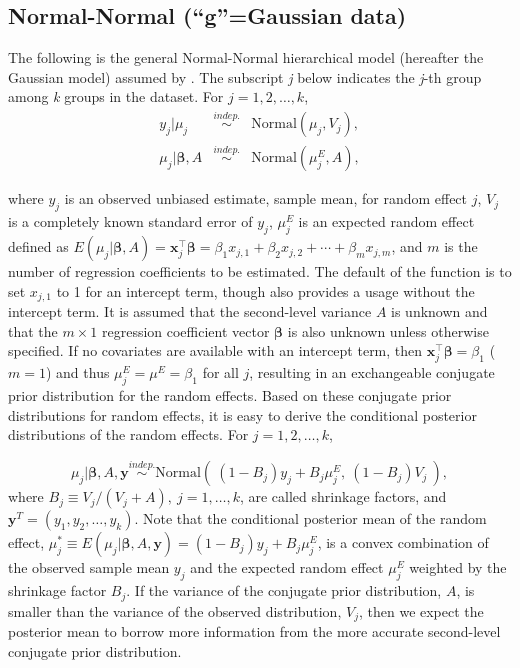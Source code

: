 \documentclass[article]{jss}
\begin{document}
\subsection[Normal-Normal]{Normal-Normal (``g''=Gaussian data)}
The following is the general Normal-Normal hierarchical model (hereafter the Gaussian model) assumed by . The subscript \emph{j} below indicates the \emph{j}-th group among \emph{k} groups in the dataset. For $j=1, 2, \ldots, k$, 
\begin{eqnarray}
y_{j}\vert \mu_{j} & \stackrel{indep.}{\sim} &\textrm{Normal}(\mu_{j}, V_{j}),\label{normalobs}\\
\mu_{j}\vert \boldsymbol{\beta}, A & \stackrel{indep.}{\sim} &\textrm{Normal}(\mu^E_{j}, A),\label{normalprior}
\end{eqnarray}


where $y_j$ is an observed unbiased estimate, sample mean, for random effect $j$, $V_{j}$ is a completely known standard error of $y_j$, $\mu^E_{j}$ is an expected random effect defined as $E(\mu_j\vert \boldsymbol{\beta}, A) = \boldsymbol{x}_j^\top \boldsymbol{\beta}=\beta_{1}x_{j, 1}+\beta_{2}x_{j, 2} + \cdots + \beta_{m}x_{j, m}$, and $m$ is the number of regression coefficients to be estimated. The default of the function  is to set $x_{j, 1}$ to 1 for an intercept term, though  also provides a usage without the intercept term.  It is assumed that the second-level variance $A$ is unknown and that the $m\times1$ regression coefficient vector $\boldsymbol{\beta}$ is also unknown unless otherwise specified. If no covariates are available with an intercept term, then $\boldsymbol{x}_j^\top \boldsymbol{\beta}=\beta_1$ ($m=1$) and thus $\mu^E_{j}=\mu^E=\beta_1$ for all $j$, resulting in an exchangeable conjugate prior distribution for the random effects.  Based on these conjugate prior distributions for random effects, it is easy to derive the conditional posterior distributions of the random effects. For $j=1, 2, \ldots, k$,

\begin{equation} \label{normalpost}
\mu_{j}\vert  \boldsymbol{\beta}, A, \boldsymbol{y} \stackrel{indep.}{\sim}\textrm{Normal}(~(1-B_{j})y_{j} + B_{j}\mu^E_{j},~(1-B_{j})V_{j}~),
\end{equation}
where $B_{j}\equiv V_{j}/(V_{j} + A),~j=1, \ldots, k$, are called shrinkage factors, and $\boldsymbol{y}^T=(y_1, y_2, \ldots, y_k)$. Note that the conditional posterior mean of the random effect, $\mu^\ast_j\equiv E(\mu_{j}\vert \boldsymbol{\beta}, A, \boldsymbol{y} )=(1-B_{j})y_{j} + B_{j}\mu^E_{j}$,  is a convex combination of the observed sample mean $y_j$ and the expected random effect $\mu^E_j$ weighted by the shrinkage factor $B_j$. If the variance of the conjugate prior distribution, $A$, is smaller than the variance of the observed distribution, $V_j$, then we expect the posterior mean to borrow more information from the more accurate second-level conjugate prior distribution.
\end{document}
